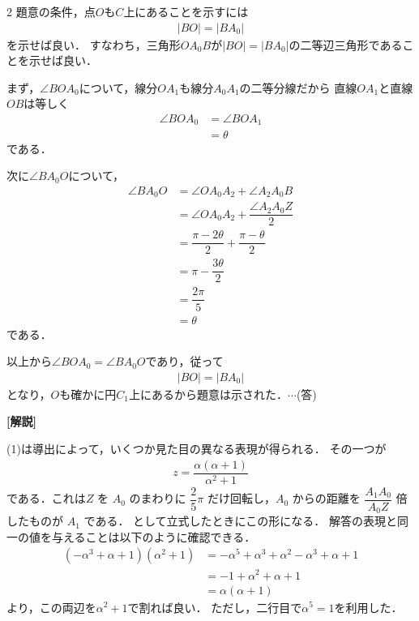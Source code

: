 \documentclass[../../main.tex]{subfiles}
\begin{document}
\begin{multicols}{2}
  題意の条件，点$O$も$C$上にあることを示すには
  \begin{align}
    |BO| = |BA_0|
  \end{align}
  を示せば良い．
  すなわち，三角形$OA_0B$が$|BO| = |BA_0|$の二等辺三角形であることを示せば良い．

  まず，$\angle BOA_0$について，線分$OA_1$も線分$A_0A_1$の二等分線だから
  直線$OA_1$と直線$OB$は等しく
  \begin{align}
    \angle BOA_0
    & = \angle BOA_1 \\
    & = \theta
  \end{align}
  である．

  次に$\angle BA_0O$について，
  \begin{align}
    \angle BA_0O
    & = \angle OA_0A_2 + \angle A_2A_0B              \\
    & = \angle OA_0A_2 + \dfrac{\angle A_2A_0Z}{2}    \\
    & = \dfrac{\pi-2\theta}{2} + \dfrac{\pi-\theta}{2} \\
    & = \pi-\dfrac{3\theta}{2}                        \\
    & = \dfrac{2\pi}{5}                               \\
    & = \theta
  \end{align}
  である．

  以上から$\angle BOA_0=\angle BA_0O$であり，従って
  \begin{align}
    |BO| = |BA_0|
  \end{align}
  となり，$O$も確かに円$C_1$上にあるから題意は示された．$\cdots$(答)

  {\bf [解説]}

  (1)は導出によって，いくつか見た目の異なる表現が得られる．
  その一つが
  \begin{align}
    z = \dfrac{\alpha(\alpha+1)}{\alpha^2+1}
  \end{align}
  である．これは$Z$ を $A_0$ のまわりに $\dfrac{2}{5}\pi$ だけ回転し，$A_0$ からの距離を $\dfrac{A_1A_0}{A_0Z}$ 倍したものが $A_1$ である．
  として立式したときにこの形になる．
  解答の表現と同一の値を与えることは以下のように確認できる．
  \begin{align}
    (-\alpha^3+\alpha+1)(\alpha^2+1)
    & = -\alpha^5+\alpha^3+\alpha^2-\alpha^3+\alpha+1 \\
    & = -1 +\alpha^2+\alpha+1                         \\
    & = \alpha(\alpha+1)
  \end{align}
  より，この両辺を$\alpha^2+1$で割れば良い．
  ただし，二行目で$\alpha^5=1$を利用した．


\end{multicols}
\end{document}

